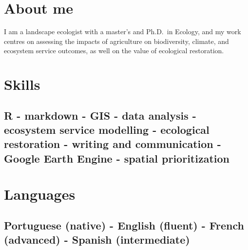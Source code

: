 \documentclass[11pt,a4paper,]{awesome-cv}
\begin{document}
\makecvheader






\hypertarget{about-me}{%
\section{About me}\label{about-me}}

I am a landscape ecologist with a master's and Ph.D.~in Ecology, and my
work centres on assessing the impacts of agriculture on biodiversity,
climate, and ecosystem service outcomes, as well on the value of
ecological restoration.

\hypertarget{skills}{%
\section{Skills}\label{skills}}

\hypertarget{r---markdown---gis---data-analysis---ecosystem-service-modelling---ecological-restoration---writing-and-communication---google-earth-engine---spatial-prioritization}{%
\subsection{R - markdown - GIS - data analysis - ecosystem service
modelling - ecological restoration - writing and communication - Google
Earth Engine - spatial
prioritization}\label{r---markdown---gis---data-analysis---ecosystem-service-modelling---ecological-restoration---writing-and-communication---google-earth-engine---spatial-prioritization}}

\hypertarget{languages}{%
\section{Languages}\label{languages}}

\hypertarget{portuguese-native---english-fluent---french-advanced---spanish-intermediate}{%
\subsection{Portuguese (native) - English (fluent) - French (advanced) -
Spanish
(intermediate)}\label{portuguese-native---english-fluent---french-advanced---spanish-intermediate}}
\end{document}
